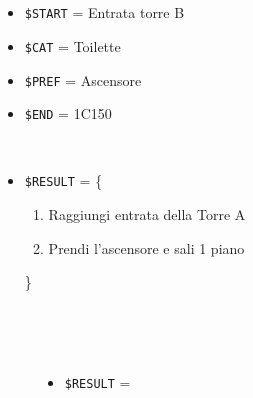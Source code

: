 \documentclass[../../SperimentazioniPratiche.tex]{subfiles}
\begin{document}
			\paragraph*{}
			\label{Prova2B.1}	
			\begin{tcolorbox}[fonttitle=\bfseries, 
								adjusted title={\Large Prova 2B.1}, 
								breakable, 
								sharp corners=south,
								colback=white, 
								colframe=white!60!black]
								
				\begin{description}[leftmargin=0.7cm,labelwidth=!]
				
					\item[Input] \ \par 
        				\begin{itemize}
        					\item \verb|$START| = Entrata torre B
							\item \verb|$CAT| = Toilette
							\item \verb|$PREF| = Ascensore
        					\item \verb|$END| = 1C150
        				\end{itemize}
        				
        			\tcbline 
        				
        			\item[Output atteso] \ \par
        				\begin{itemize}
        					\item \verb|$RESULT| = \{
        					\begin{enumerate}
        						\item Raggiungi entrata della Torre A
        						\item Prendi l'ascensore e sali 1 piano
        					\end{enumerate}
        					\}
        				\end{itemize}

					\tcbline        				
        				
        			\item[Output riscontrato] \ \par
        				\begin{description}
        				
        					\item[\dispositivoA] \ \par
        					\begin{itemize}
        						\item \verb|$RESULT| = \ns
        					\end{itemize}      					
        					

\end{description}
\end{description}
\end{tcolorbox}
\end{document}
